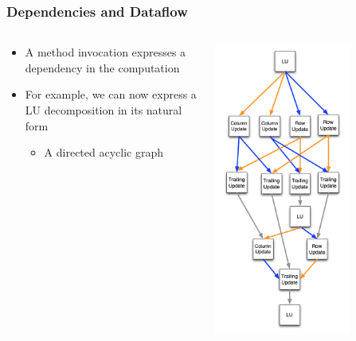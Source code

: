 \begin{frame}[fragile]
  \frametitle{Dependencies and Dataflow}
    \begin{columns}
    \begin{column}{0.55\textwidth}
      \begin{itemize}
      \item A method invocation expresses a dependency in the computation
      \item For example, we can now express a LU decomposition in its natural
        form
        \begin{itemize}
        \item A directed acyclic graph
        \end{itemize}
      \end{itemize}
    \end{column}
    \begin{column}{0.45\textwidth}
      \includegraphics[width=0.7\textwidth]{figures/ludag.png}
    \end{column}
  \end{columns}
\end{frame}
